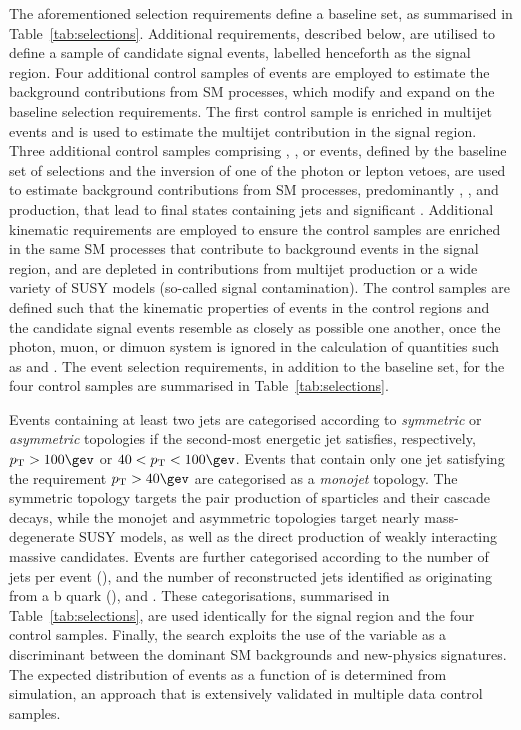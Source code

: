 The aforementioned selection requirements define a baseline set, as
summarised in Table~\ref{tab:selections}. Additional requirements,
described below, are utilised to define a sample of candidate signal
events, labelled henceforth as the signal region. Four additional
control samples of events are employed to estimate the background
contributions from SM processes, which modify and expand on the
baseline selection requirements. The first control sample is enriched
in multijet events and is used to estimate the multijet contribution
in the signal region. Three additional control samples comprising \gj,
\mj, or \mmj events, defined by the baseline set of selections and the
inversion of one of the photon or lepton vetoes, are used to estimate
background contributions from SM processes, predominantly \wlj,
\znunuj, and \ttbar production, that lead to final states containing
jets and significant \ptvecmiss. Additional kinematic requirements
are employed to ensure the control samples are enriched in the same SM
processes that contribute to background events in the signal region,
and are depleted in contributions from multijet production or a wide
variety of SUSY models (\ie so-called signal contamination).  The
control samples are defined such that the kinematic properties of
events in the control regions and the candidate signal events resemble
as closely as possible one another, once the photon, muon, or dimuon
system is ignored in the calculation of quantities such as \scalht and
\HTmiss. The event selection requirements, in addition to the baseline
set, for the four control samples are summarised in
Table~\ref{tab:selections}.

Events containing at least two jets are categorised according to {\it
  symmetric} or {\it asymmetric} topologies if the second-most
energetic jet satisfies, respectively, $\Pt > 100\gev$ or $40 < \Pt <
100\gev$. Events that contain only one jet satisfying the requirement
$\Pt > 40\gev$ are categorised as a {\it monojet} topology. The
symmetric topology targets the pair production of sparticles and their
cascade decays, while the monojet and asymmetric topologies target
nearly mass-degenerate SUSY models, as well as the direct production
of weakly interacting massive candidates. Events are further
categorised according to the number of jets per event (\njet), and the
number of reconstructed jets identified as originating from a b quark
(\nb), and \scalht. These categorisations, summarised in
Table~\ref{tab:selections}, are used identically for the signal region
and the four control samples. Finally, the search exploits the use of
the \mht variable as a discriminant between the dominant SM
backgrounds and new-physics signatures. The expected distribution of
events as a function of \mht is determined from simulation, an
approach that is extensively validated in multiple data control
samples.


